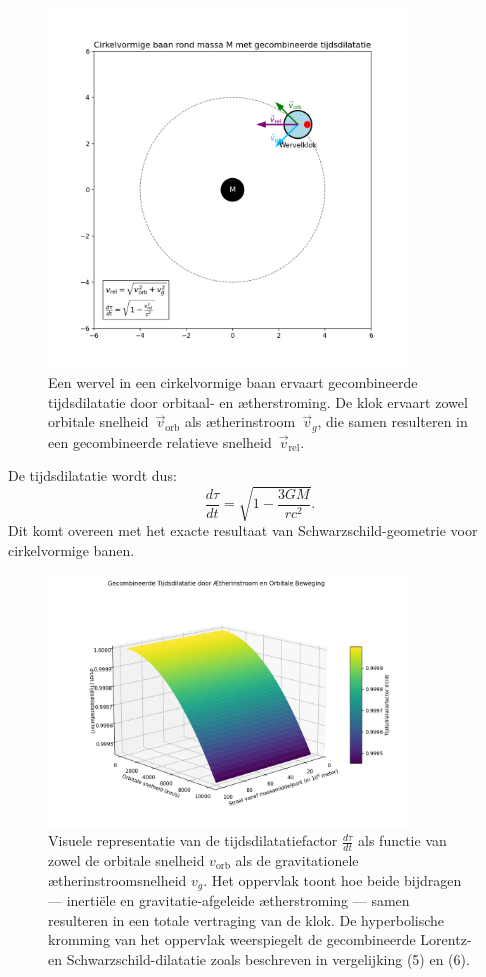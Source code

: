 \begin{figure}[htbp]
    \centering
    \includegraphics[width=0.85\textwidth]{08-BaanRondMassa_nl}
    \caption{Een wervel in een cirkelvormige baan ervaart gecombineerde tijdsdilatatie door orbitaal- en ætherstroming. De klok ervaart zowel orbitale snelheid~$\vec{v}_{\mathrm{orb}}$ als ætherinstroom~$\vec{v}_g$, die samen resulteren in een gecombineerde relatieve snelheid~$\vec{v}_{\mathrm{rel}}$.}
    \label{fig:BaanRondMassa}
\end{figure}

De tijdsdilatatie wordt dus:
\[
    \frac{d\tau}{dt} = \sqrt{1 - \frac{3GM}{rc^2}}. \tag{6}
\]
Dit komt overeen met het exacte resultaat van Schwarzschild-geometrie voor cirkelvormige banen.

\begin{figure}[htbp]
    \centering
    \includegraphics[width=0.85\textwidth]{09-CombinedTimeDilationSurface_nl}
    \caption{Visuele representatie van de tijdsdilatatiefactor \( \frac{d\tau}{dt} \) als functie van zowel de orbitale snelheid \( v_{\text{orb}} \) als de gravitationele ætherinstroomsnelheid \( v_g \). Het oppervlak toont hoe beide bijdragen — inertiële en gravitatie-afgeleide ætherstroming — samen resulteren in een totale vertraging van de klok. De hyperbolische kromming van het oppervlak weerspiegelt de gecombineerde Lorentz- en Schwarzschild-dilatatie zoals beschreven in vergelijking (5) en (6).}
    \label{fig:TimeDialationCombined}
\end{figure}

